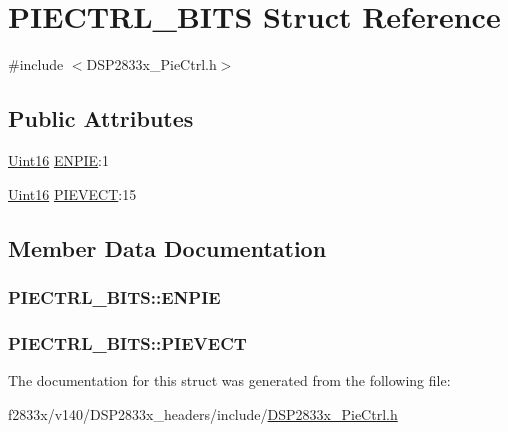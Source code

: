 \hypertarget{struct_p_i_e_c_t_r_l___b_i_t_s}{}\section{P\+I\+E\+C\+T\+R\+L\+\_\+\+B\+I\+T\+S Struct Reference}
\label{struct_p_i_e_c_t_r_l___b_i_t_s}


{\ttfamily \#include $<$D\+S\+P2833x\+\_\+\+Pie\+Ctrl.\+h$>$}

\subsection*{Public Attributes}
\begin{DoxyCompactItemize}
\item 
\hyperlink{_d_s_p2833x___device_8h_a59a9f6be4562c327cbfb4f7e8e18f08b}{Uint16} \hyperlink{struct_p_i_e_c_t_r_l___b_i_t_s_ab5057e8cf1236af986b7314e0816d22f}{E\+N\+P\+I\+E}\+:1
\item 
\hyperlink{_d_s_p2833x___device_8h_a59a9f6be4562c327cbfb4f7e8e18f08b}{Uint16} \hyperlink{struct_p_i_e_c_t_r_l___b_i_t_s_ad0658a1fe72cc4d22b5c42cfdc8dfce3}{P\+I\+E\+V\+E\+C\+T}\+:15
\end{DoxyCompactItemize}


\subsection{Member Data Documentation}
\hypertarget{struct_p_i_e_c_t_r_l___b_i_t_s_ab5057e8cf1236af986b7314e0816d22f}{}
\subsubsection[{E\+N\+P\+I\+E}]{ P\+I\+E\+C\+T\+R\+L\+\_\+\+B\+I\+T\+S\+::\+E\+N\+P\+I\+E}\label{struct_p_i_e_c_t_r_l___b_i_t_s_ab5057e8cf1236af986b7314e0816d22f}
\hypertarget{struct_p_i_e_c_t_r_l___b_i_t_s_ad0658a1fe72cc4d22b5c42cfdc8dfce3}{}
\subsubsection[{P\+I\+E\+V\+E\+C\+T}]{ P\+I\+E\+C\+T\+R\+L\+\_\+\+B\+I\+T\+S\+::\+P\+I\+E\+V\+E\+C\+T}\label{struct_p_i_e_c_t_r_l___b_i_t_s_ad0658a1fe72cc4d22b5c42cfdc8dfce3}


The documentation for this struct was generated from the following file\+:\begin{DoxyCompactItemize}
\item 
f2833x/v140/\+D\+S\+P2833x\+\_\+headers/include/\hyperlink{_d_s_p2833x___pie_ctrl_8h}{D\+S\+P2833x\+\_\+\+Pie\+Ctrl.\+h}\end{DoxyCompactItemize}
